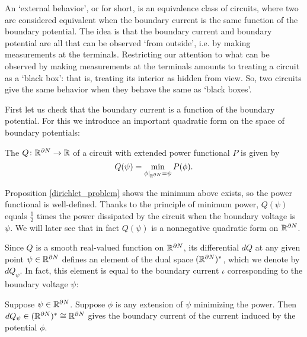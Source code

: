 An `external behavior', or  for short, is an equivalence class of circuits, where two are considered equivalent when the boundary current is the same function of the boundary potential. The idea is that the boundary current and boundary potential are all that can be observed `from outside', i.e. by making measurements at the terminals.  Restricting our attention to what can be observed by making measurements at the terminals amounts to treating a circuit as a `black box': that is, treating its interior as hidden from view.  So, two circuits give the same behavior when they behave the same as `black boxes'.

First let us check that the boundary current is a function of the boundary potential.  For this we introduce an important quadratic form on the space of boundary potentials:

\begin{definition}
The  $Q {\colon} {\mathbb{R}}^{\partial N} \to {\mathbb{R}}$ of a circuit with extended power functional $P$ is given by
\[
 Q(\psi) = \min_{\phi|_{{\mathbb{R}}^{\partial N}} = \psi } P(\phi).
\]
\end{definition}

Proposition \ref{dirichlet_problem} shows the minimum above exists, so the power functional is well-defined.  Thanks to the principle of minimum power, $Q(\psi)$ equals $\frac{1}{2}$ times the power dissipated by the circuit when the boundary voltage is $\psi$.  We will later see that in fact $Q(\psi)$ is a nonnegative quadratic form on ${\mathbb{R}}^{\partial N}$. 

Since $Q$ is a smooth real-valued function on ${\mathbb{R}}^{\partial N}$, its differential $d Q$ at any given point $\psi \in {\mathbb{R}}^{\partial N}$ defines an element of the dual space $({\mathbb{R}}^{\partial N})^\ast$, which we denote by $d Q_\psi$.  In fact, this element is equal to the boundary current $\iota$ corresponding to the boundary voltage $\psi$:

\begin{proposition} \label{boundary_current_determines_boundary_voltage}
Suppose $\psi \in {\mathbb{R}}^{\partial N}$.  Suppose $\phi$ is any extension of $\psi$ minimizing the power. Then $dQ_\psi \in ({\mathbb{R}}^{\partial N})^\ast \cong {\mathbb{R}}^{\partial N}$ gives the boundary current of the current induced by the potential $\phi$.
\end{proposition}

